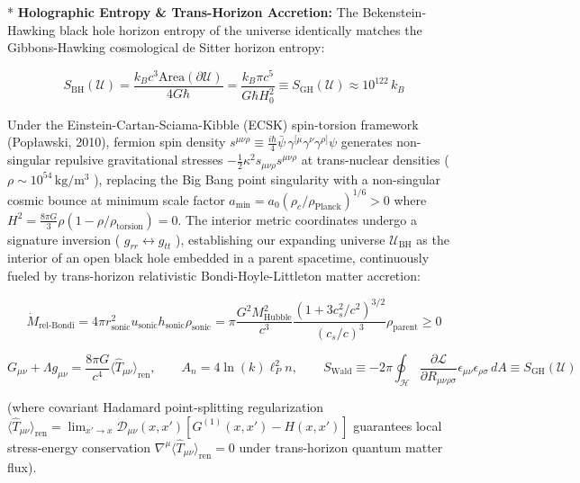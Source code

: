 \documentclass[11pt,a4paper]{article}
\theoremstyle{definition}
\theoremstyle{remark}
\begin{document}
* \textbf{Holographic Entropy \& Trans-Horizon Accretion:}
The Bekenstein-Hawking black hole horizon entropy of the universe identically matches the Gibbons-Hawking cosmological de Sitter horizon entropy:


\begin{equation}
\boxed{S_{\text{BH}}(\mathcal{U}) = \frac{k_B c^3 \mathrm{Area}(\partial \mathcal{U})}{4 G \hbar} = \frac{k_B \pi c^5}{G \hbar H_0^2} \equiv S_{\text{GH}}(\mathcal{U}) \approx 10^{122} \, k_B}
\end{equation}


Under the Einstein-Cartan-Sciama-Kibble (ECSK) spin-torsion framework (Popławski, 2010), fermion spin density $s^{\mu\nu\rho} \equiv \frac{i\hbar}{4}\bar{\psi} \, \gamma^{[\mu}\gamma^\nu\gamma^{\rho]}\psi$ generates non-singular repulsive gravitational stresses $-\frac{1}{2}\kappa^2 s_{\mu\nu\rho}s^{\mu\nu\rho}$ at trans-nuclear densities ( $\rho \sim 10^{54} \, \mathrm{kg/m^3}$ ), replacing the Big Bang point singularity with a non-singular cosmic bounce at minimum scale factor $a_{\text{min}} = a_0 (\rho_c / \rho_{\text{Planck}})^{1/6} > 0$ where $H^2 = \frac{8\pi G}{3}\rho(1 - \rho/\rho_{\text{torsion}}) = 0$. The interior metric coordinates undergo a signature inversion ( $g_{rr} \leftrightarrow g_{tt}$ ), establishing our expanding universe $\mathcal{U}_{\text{BH}}$ as the interior of an open black hole embedded in a parent spacetime, continuously fueled by trans-horizon relativistic Bondi-Hoyle-Littleton matter accretion:


\begin{equation}
\boxed{\dot{M}_{\text{rel-Bondi}} = 4\pi r_{\text{sonic}}^2 u_{\text{sonic}} h_{\text{sonic}} \rho_{\text{sonic}} = \pi \frac{G^2 M_{\text{Hubble}}^2}{c^3} \frac{\left( 1 + 3 c_s^2/c^2 \right)^{3/2}}{(c_s/c)^3} \rho_{\text{parent}} \ge 0}
\end{equation}



\begin{equation}
\boxed{G_{\mu\nu} + \Lambda g_{\mu\nu} = \frac{8\pi G}{c^4} \langle \hat{T}_{\mu\nu} \rangle_{\text{ren}}, \qquad A_n = 4 \ln(k) \ell_P^2 n, \qquad S_{\text{Wald}} \equiv -2\pi \oint_{\mathcal{H}} \frac{\partial \mathcal{L}}{\partial R_{\mu\nu\rho\sigma}} \epsilon_{\mu\nu}\epsilon_{\rho\sigma} \, dA \equiv S_{\text{GH}}(\mathcal{U})}
\end{equation}


(where covariant Hadamard point-splitting regularization $\langle \hat{T}_{\mu\nu} \rangle_{\text{ren}} = \lim_{x'\to x} \mathcal{D}_{\mu\nu}(x, x') [G^{(1)}(x, x') - H(x, x')]$ guarantees local stress-energy conservation $\nabla^\mu \langle \hat{T}_{\mu\nu} \rangle_{\text{ren}} = 0$ under trans-horizon quantum matter flux).
\end{document}
